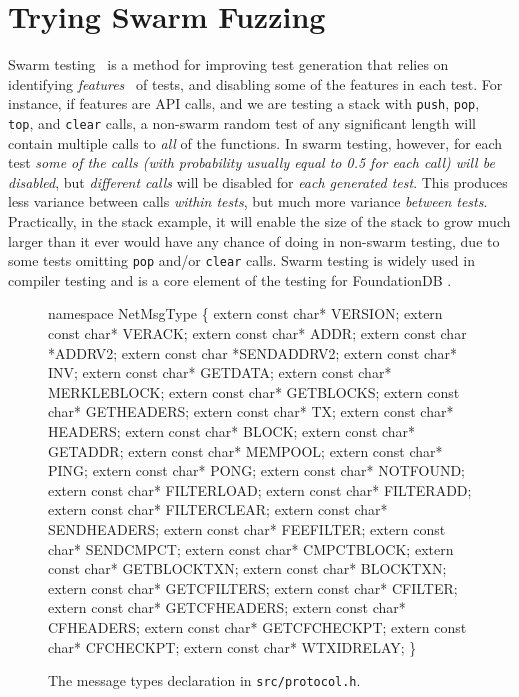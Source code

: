 \section{Trying Swarm Fuzzing}

Swarm testing~\cite{ISSTA12} is a method for improving test
generation that relies on identifying \emph{features}~\cite{groce2013help} of tests, and
disabling some of the features in each test.  For instance, if features are
API calls, and we are testing a stack with {\tt push}, {\tt pop}, {\tt
  top}, and {\tt clear} calls, a non-swarm random test of any
significant length will contain multiple calls to \emph{all} of
the functions.  In swarm testing, however, for each test \emph{some of the calls
(with probability usually equal to 0.5 for each call) will be
disabled}, but \emph{different calls} will be disabled for \emph{each generated
test}.  This produces less variance between calls \emph{within tests}, but
much more variance \emph{between tests}.  Practically, in the stack
example, it will enable the size of the stack to grow much larger than
it ever would have any chance of doing in non-swarm testing, due to
some tests omitting {\tt pop} and/or {\tt clear} calls.  Swarm testing
is widely used in compiler testing
\cite{le2014compiler} and is a core element of the
testing for FoundationDB \cite{zhou2021foundationdb}.

\begin{figure}
{
\begin{code}
namespace NetMsgType \{
  extern const char* VERSION;
  extern const char* VERACK;
  extern const char* ADDR;
  extern const char *ADDRV2;
  extern const char *SENDADDRV2;
  extern const char* INV;
  extern const char* GETDATA;
  extern const char* MERKLEBLOCK;
  extern const char* GETBLOCKS;
  extern const char* GETHEADERS;
  extern const char* TX;
  extern const char* HEADERS;
  extern const char* BLOCK;
  extern const char* GETADDR;
  extern const char* MEMPOOL;
  extern const char* PING;
  extern const char* PONG;
  extern const char* NOTFOUND;
  extern const char* FILTERLOAD;
  extern const char* FILTERADD;
  extern const char* FILTERCLEAR;
  extern const char* SENDHEADERS;
  extern const char* FEEFILTER;
  extern const char* SENDCMPCT;
  extern const char* CMPCTBLOCK;
  extern const char* GETBLOCKTXN;
  extern const char* BLOCKTXN;
  extern const char* GETCFILTERS;
  extern const char* CFILTER;
  extern const char* GETCFHEADERS;
  extern const char* CFHEADERS;
  extern const char* GETCFCHECKPT;
  extern const char* CFCHECKPT;
  extern const char* WTXIDRELAY;
  \}
\end{code}
}
\caption{The message types declaration in {\tt src/protocol.h}.}
\label{types}
\end{figure}

